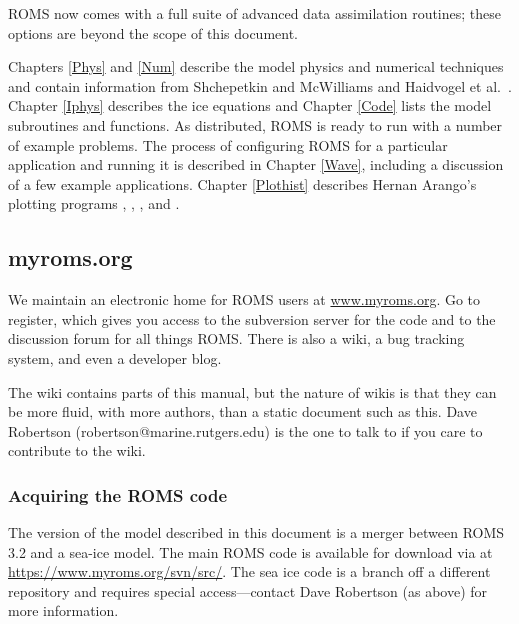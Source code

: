 ROMS now comes with a full suite of advanced data assimilation
routines; these options are beyond the scope of this document.

Chapters \ref{Phys} and \ref{Num} describe the model physics and
numerical techniques and contain information from Shchepetkin and
McWilliams \cite{SS2008b} and Haidvogel et al.\
\cite{Haidvogel07}.
Chapter \ref{Iphys} describes the ice equations and
Chapter \ref{Code} lists the model subroutines and functions.
As distributed, ROMS is ready to run with a number of example problems.
The process of configuring ROMS for a particular application and
running it is
described in Chapter \ref{Wave}, including a discussion of a few example
applications.
Chapter \ref{Plothist} describes Hernan Arango's plotting
programs , , , and .

\subsection{myroms.org}
\label{Svn}
We maintain an electronic home for ROMS users at
\href{http://www.myroms.org}{www.myroms.org}. Go to register,
which gives you access to the subversion server for the code and to
the  discussion forum for all things ROMS. There is also a wiki,
a bug tracking system, and even a developer blog.

The wiki contains parts of this manual, but the nature of wikis is that
they can be more fluid, with more authors, than a static document such
as this. Dave Robertson (robertson@marine.rutgers.edu) is the one to
talk to if you care to contribute to the wiki.

\subsubsection{Acquiring the ROMS code}
The version of the model described in this document is a merger between
ROMS 3.2 and a sea-ice model. The main ROMS code is available for
download via \code{svn} at
\href{https://www.myroms.org/svn/src/}{https://www.myroms.org/svn/src/}.
The sea ice code is a branch off a different repository and requires
special access---contact Dave Robertson (as above) for more information.

